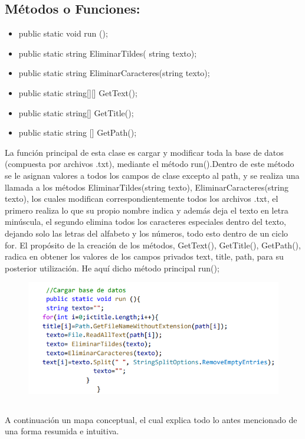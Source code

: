 \documentclass[a4paper,12pt]{article}
\begin{document}
\subsection*{Métodos o Funciones:}
\begin{itemize}
    \item  public static void run (); 
    \item public static string EliminarTildes( string texto);
    \item public static string EliminarCaracteres(string texto);
    \item public static string[][] GetText();
    \item public static string[] GetTitle();
    \item public static string [] GetPath();
    
\end{itemize}
La función principal de esta clase es cargar y modificar toda la base de datos (compuesta por 
archivos .txt), mediante el método run().Dentro de este método se le asignan valores a todos 
los campos de clase excepto al path, y se realiza una llamada a los métodos 
EliminarTildes(string texto), EliminarCaracteres(string texto), los cuales modifican 
correspondientemente todos los archivos .txt, el primero realiza lo que su propio nombre 
indica y además deja el texto en letra minúscula, el segundo elimina todos los caracteres
especiales dentro del texto, dejando solo las letras del alfabeto y los números, todo esto 
dentro de un ciclo for. El propósito de la creación de los métodos, GetText(), GetTitle(), 
GetPath(), radica en obtener los valores de los campos privados text, title, path, para su 
posterior utilización. He aquí dicho método principal run();
\begin{figure}[h]
    \includegraphics*{Code 1.png}
    
\end{figure} 
\subsection*{}
A continuación un mapa conceptual, el cual explica todo lo antes 
mencionado de una forma resumida e intuitiva.
\end{document}
